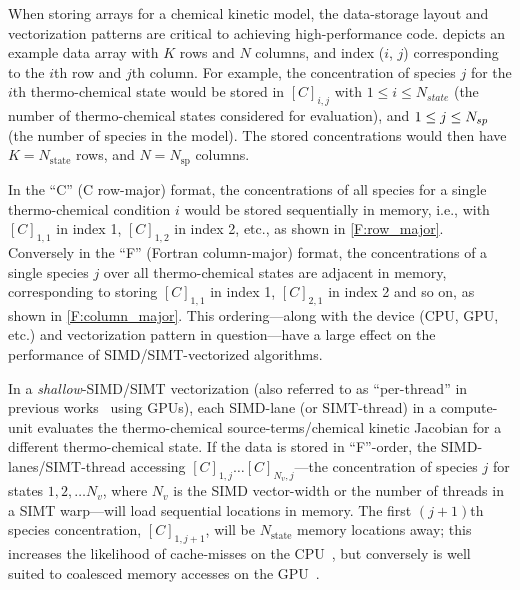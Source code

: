 \documentclass[12pt,number,sort&compress,preprint]{elsarticle}
\begin{document}
When storing arrays for a chemical kinetic model, the data-storage layout and vectorization patterns are critical to achieving high-performance code.
 depicts an example data array with $K$ rows and $N$ columns, and index ($i$, $j$) corresponding to the $i$th row and $j$th column.
For example, the concentration of species $j$ for the $i$th thermo-chemical state would be stored in $[C]_{i, j}$ with $1 \le i \le N_{state}$ (the number of thermo-chemical states considered for evaluation), and $1 \le j \le \ns/$ (the number of species in the model).
The stored concentrations would then have $K = N_{\text{state}}$ rows, and $N = N_{\text{sp}}$ columns.

In the ``C'' (C row-major) format, the concentrations of all species for a single thermo-chemical condition $i$ would be stored sequentially in memory, i.e., with  $[C]_{1, 1}$ in index \num{1}, $[C]_{1, 2}$ in index \num{2}, etc., as shown in \cref{F:row_major}.
Conversely in the ``F'' (Fortran column-major) format, the concentrations of a single species $j$ over all thermo-chemical states are adjacent in memory, corresponding to storing $[C]_{1, 1}$ in index \num{1}, $[C]_{2, 1}$ in index \num{2} and so on, as shown in \cref{F:column_major}.
This ordering---along with the device (CPU, GPU, etc.\@) and vectorization pattern in question---have a large effect on the performance of SIMD\slash SIMT-vectorized algorithms.

In a \textit{shallow}-SIMD\slash SIMT vectorization (also referred to as ``per-thread'' in previous works~\cite{Stone:2013aa} using GPUs), each SIMD-lane (or SIMT-thread) in a compute-unit evaluates the thermo-chemical source-terms\slash chemical kinetic Jacobian for a different thermo-chemical state.
If the data is stored in ``F''-order, the SIMD-lanes\slash SIMT-thread accessing $[C]_{1, j}\ldots[C]_{N_v, j}$---the concentration of species $j$ for states $1, 2,\ldots N_v$, where $N_v$ is the SIMD vector-width or the number of threads in a SIMT warp---will load sequential locations in memory.
The first $(j+1)$th species concentration, $[C]_{1, j+1}$, will be $N_{\text{state}}$ memory locations away; this increases the likelihood of cache-misses on the CPU~\cite{gray2000rules}, but conversely is well suited to coalesced memory accesses on the GPU~\cite{NVIDIA:2018}.
\end{document}
